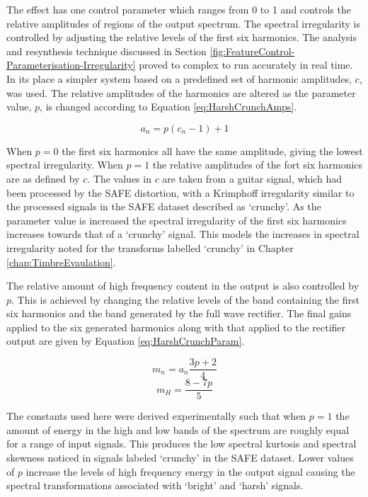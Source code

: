 			The effect has one control parameter which ranges from 0 to 1 and controls the relative amplitudes
			of regions of the output spectrum. The spectral irregularity is controlled by adjusting the
			relative levels of the first six harmonics. The analysis and resynthesis technique discussed in
			Section \ref{fig:FeatureControl-Parameterisation-Irregularity} proved to complex to run accurately
			in real time. In its place a simpler system based on a predefined set of harmonic amplitudes,
			$c$, was used. The relative amplitudes of the harmonics are altered as the parameter value, $p$,
			is changed according to Equation \ref{eq:HarshCrunchAmps}.

			\begin{equation}
				a_{n} = p(c_{n} - 1) + 1
				\label{eq:HarshCrunchAmps}
			\end{equation}

			When $p = 0$ the first six harmonics all have the same amplitude, giving the lowest spectral
			irregularity. When $p = 1$ the relative amplitudes of the fort six harmonics are as defined by $c$.
			The values in $c$ are taken from a guitar signal, which had been processed by the SAFE distortion,
			with a Krimphoff irregularity similar to the processed signals in the SAFE dataset described as
			`crunchy'. As the parameter value is increased the spectral irregularity of the first six harmonics
			increases towards that of a `crunchy' signal. This models the increases in spectral irregularity
			noted for the transforms labelled `crunchy' in Chapter \ref{chap:TimbreEvaulation}.
			
			The relative amount of high frequency content in the output is also controlled by $p$. This is
			achieved by changing the relative levels of the band containing the first six harmonics and the band
			generated by the full wave rectifier. The final gains applied to the six generated harmonics along
			with that applied to the rectifier output are given by Equation \ref{eq:HarshCrunchParam}.

			\[ m_{n} = a_{n}\frac{3p + 2}{4} \]
			\begin{equation}
				m_{H} = \frac{8 - 7p}{5}
				\label{eq:HarshCrunchParam}
			\end{equation}

			The constants used here were derived experimentally such that when $p = 1$ the amount of energy in
			the high and low bands of the spectrum are roughly equal for a range of input signals. This produces
			the low spectral kurtosis and spectral skewness noticed in signals labeled `crunchy' in the SAFE
			dataset. Lower values of $p$ increase the levels of high frequency energy in the output signal
			causing the spectral transformations associated with `bright' and `harsh' signals.

